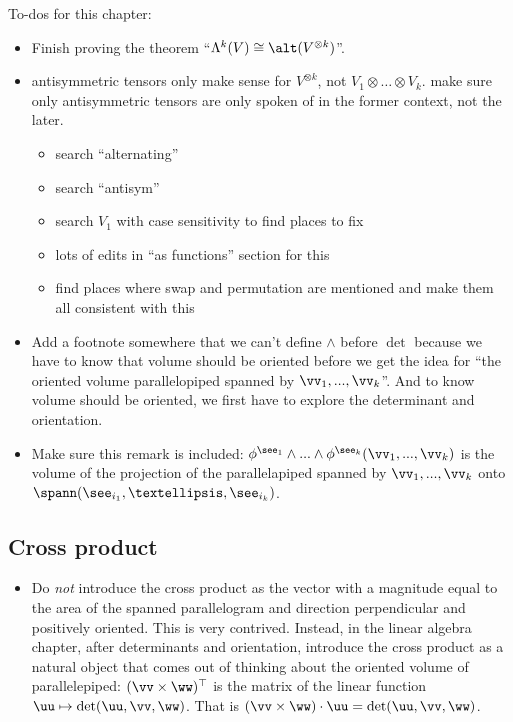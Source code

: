 To-dos for this chapter:

\begin{itemize}
   \item Finish proving the theorem ``$\Lambda^k(V) \cong \alt(V^{\otimes k})$''.
   \item antisymmetric tensors only make sense for $V^{\otimes k}$, not $V_1 \otimes … \otimes V_k$. make sure only antisymmetric tensors are only spoken of in the former context, not the later.
    \begin{itemize}
        \item search “alternating”
        \item search “antisym”
        \item search $V_1$ with case sensitivity to find places to fix
        \item lots of edits in “as functions” section for this
        \item find places where swap and permutation are mentioned and make them all consistent with this
    \end{itemize}
    \item Add a footnote somewhere that we can't define $\wedge$ before $\det$ because we have to know that volume should be oriented before we get the idea for ``the oriented volume parallelopiped spanned by $\vv_1, ..., \vv_k$''. And to know volume should be oriented, we first have to explore the determinant and orientation.
    \item Make sure this remark is included: $\phi^{\see_1} \wedge ... \wedge \phi^{\see_k}(\vv_1, ..., \vv_k)$ is the volume of the projection of the parallelapiped spanned by $\vv_1, ..., \vv_k$ onto $\spann(\see_{i_1}, …, \see_{i_k})$.
\end{itemize}

\subsection*{Cross product}

\begin{itemize}
    \item Do \textit{not} introduce the cross product as the vector with a magnitude equal to the area of the spanned parallelogram and direction perpendicular and positively oriented. This is very contrived. Instead, in the linear algebra chapter, after determinants and orientation, introduce the cross product as a natural object that comes out of thinking about the oriented volume of parallelepiped: $(\vv \times \ww)^\top$ is the matrix of the linear function $\uu \mapsto \det(\uu, \vv, \ww)$. That is $(\vv \times \ww) \cdot \uu = \det(\uu, \vv, \ww)$. 
\end{itemize}


